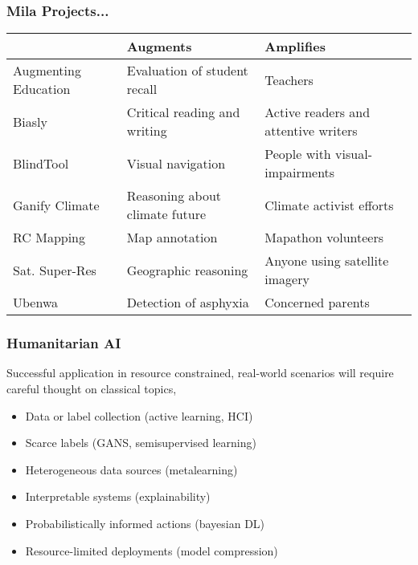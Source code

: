 \documentclass[10pt,mathserif]{beamer}
\begin{document}
\begin{frame}
  \frametitle{Mila Projects...}
\begin{table}[]
   \begin{tabular}{|p{2cm}|p{4cm}|p{4cm}|}
     \hline
                           & \textbf{Augments}                       & \textbf{Amplifies}                                                         \\\hline
Augmenting Education       & Evaluation of student recall  & Teachers \\\hline
Biasly                     & Critical reading and writing       & Active readers and attentive writers\\\hline
BlindTool                  & Visual navigation      & People with visual-impairments \\\hline
Ganify Climate & Reasoning about climate future   & Climate activist efforts                                                                           \\\hline
RC Mapping          & Map annotation      & Mapathon volunteers \\\hline
Sat. Super-Res & Geographic reasoning & Anyone using satellite imagery                                                                           \\\hline
Ubenwa & Detection of asphyxia & Concerned parents \\\hline
\end{tabular}
\end{table}
\end{frame}

\begin{frame}
  \frametitle{Humanitarian AI}
  Successful application in resource constrained, real-world scenarios will
  require careful thought on classical topics,
  \begin{itemize}
  \item Data or label collection (active learning, HCI)
  \item Scarce labels (GANS, semisupervised learning)
  \item Heterogeneous data sources (metalearning)
  \item Interpretable systems (explainability)
  \item Probabilistically informed actions (bayesian DL)
  \item Resource-limited deployments (model compression)
  \end{itemize}
\end{frame}
\end{document}
